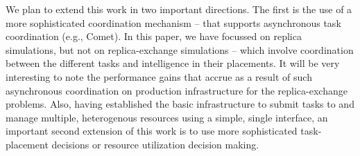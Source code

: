 \documentclass[conference,final]{IEEEtran}
\begin{document}
We plan to extend this work in two important directions. The first is
the use of a more sophisticated coordination mechanism -- that
supports asynchronous task coordination (e.g., Comet). In this paper,
we have focussed on replica simulations, but not on replica-exchange
simulations -- which involve coordination between the different tasks
and intelligence in their placements.  It will be very interesting to
note the performance gains that accrue as a result of such
asynchronous coordination on production infrastructure for the
replica-exchange problems. Also, having established the basic
infrastructure to submit tasks to and manage multiple, heterogenous
resources using a simple, single interface, an important second
extension of this work is to use more sophisticated task-placement
decisions or resource utilization decision making.



\end{document}
